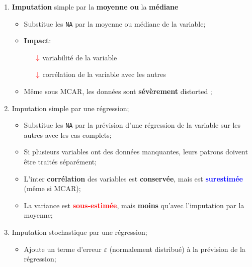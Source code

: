 \documentclass[10pt, french]{article}
\begin{document}
\begin{multicols*}{3}
\begin{enumerate}
\begin{itemize}
		\end{itemize}
	\item	\textbf{Imputation} simple par la \textbf{moyenne ou} la \textbf{médiane}
		\begin{itemize}
		\item	Substitue les \texttt{NA} par la moyenne ou médiane de la variable;
		\item	\textbf{Impact}:
			\begin{itemize}
			\item[$\color{red}\downarrow$]	variabilité de la variable	\\
			\item[$\color{red}\downarrow$]	corrélation de la variable avec les autres	\\
			\end{itemize}
		\item	Même sous MCAR, les données sont \textbf{sévèrement} \og distorted \fg{};
		\end{itemize}
	\item	Imputation simple par une régression;
		\begin{itemize}
		\item	Substitue les \texttt{NA} par la prévision d'une régression de la variable sur les autres avec les cas complets;
		\item	Si plusieurs variables ont des données manquantes, leurs patrons doivent être traités séparément;
		\item	L'inter \textbf{corrélation} des variables est \textbf{conservée}, mais est \textcolor{blue}{\textbf{surestimée}} (même si MCAR);
		\item	La variance est \textcolor{red}{\textbf{sous-estimée}}, mais \textbf{moins} qu'avec l'imputation par la moyenne;
		\end{itemize}
	\item	Imputation stochastique par une régression;
		\begin{itemize}
		\item	Ajoute un terme d'erreur $\varepsilon$ (normalement distribué) à la prévision de la régression;

\end{itemize}
\end{enumerate}
\end{multicols*}
\end{document}
